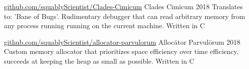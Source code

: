 \documentclass{awesome-cv}
\begin{document}
		\begin{cventries}
			\cventry
				{\href{https://github.com/squablyScientist/Clades-Cimicum}{github.com/squablyScientist/Clades-Cimicum}}
				{Clades Cīmicum}
				{2018}
				{}
				{Translates to: 'Bane of Bugs'. Rudimentary debugger that can read arbitrary memory from any process running running on the current machine. Written in C}

			\cventry
				{\href{https://github.com/squablyScientist/allocator-parvulorum}{github.com/squablyScientist/allocator-parvulorum}}
				{Allocātor Parvulōrum}
				{2018}
				{}
				{Custom memory allocator that prioritizes space efficiency over time efficiency, succeeds at keeping the heap as small as possible. Written in C}


		\end{cventries}
	\vspace{0.5cm}
\end{document}
